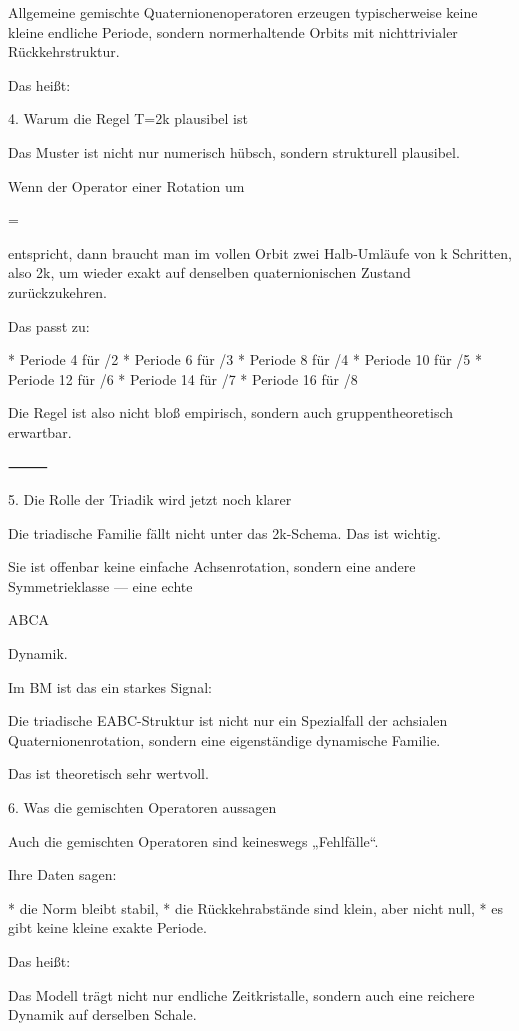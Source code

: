 \documentclass[11pt,a4paper]{article}
\theoremstyle{definition}
\begin{document}
Allgemeine gemischte Quaternionenoperatoren erzeugen typischerweise keine kleine endliche Periode, sondern normerhaltende Orbits mit nichttrivialer Rückkehrstruktur.

Das heißt:



4. Warum die Regel T=2k plausibel ist

Das Muster ist nicht nur numerisch hübsch, sondern strukturell plausibel.

Wenn der Operator einer Rotation um

\theta=

entspricht, dann braucht man im vollen Orbit zwei Halb-Umläufe von k Schritten, also 2k, um wieder exakt auf denselben quaternionischen Zustand zurückzukehren.

Das passt zu:

* Periode 4 für \pi/2
* Periode 6 für \pi/3
* Periode 8 für \pi/4
* Periode 10 für \pi/5
* Periode 12 für \pi/6
* Periode 14 für \pi/7
* Periode 16 für \pi/8

Die Regel ist also nicht bloß empirisch, sondern auch gruppentheoretisch erwartbar.

⸻

5. Die Rolle der Triadik wird jetzt noch klarer

Die triadische Familie fällt nicht unter das 2k-Schema.
Das ist wichtig.

Sie ist offenbar keine einfache Achsenrotation, sondern eine andere Symmetrieklasse — eine echte

A\to B\to C\to A

Dynamik.

Im BM ist das ein starkes Signal:

Die triadische EABC-Struktur ist nicht nur ein Spezialfall der achsialen Quaternionenrotation,
sondern eine eigenständige dynamische Familie.

Das ist theoretisch sehr wertvoll.

6. Was die gemischten Operatoren aussagen

Auch die gemischten Operatoren sind keineswegs „Fehlfälle“.

Ihre Daten sagen:

* die Norm bleibt stabil,
* die Rückkehrabstände sind klein, aber nicht null,
* es gibt keine kleine exakte Periode.

Das heißt:

Das Modell trägt nicht nur endliche Zeitkristalle, sondern auch eine reichere Dynamik auf derselben Schale.
\end{document}

